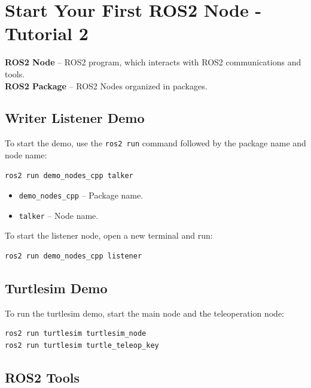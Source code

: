 \documentclass{article}
\newcommand{\code}[1]{\colorbox{codeBg}{\texttt{#1}}}
\begin{document}
\newpage

\section{Start Your First ROS2 Node - Tutorial 2}

\begin{notebox}
\textbf{ROS2 Node} -- ROS2 program, which interacts with ROS2 communications and tools. \\
\textbf{ROS2 Package} -- ROS2 Nodes organized in packages.
\end{notebox}

\subsection*{Writer Listener Demo}

To start the demo, use the \code{ros2 run} command followed by the package name and node name:
\begin{lstlisting}[style=bashStyle, language=bash]
ros2 run demo_nodes_cpp talker
\end{lstlisting}
\begin{itemize}
    \item \code{demo\_nodes\_cpp} -- Package name.
    \item \code{talker} -- Node name.
\end{itemize}

\vspace{0.3cm}
\noindent To start the listener node, open a new terminal and run:
\begin{lstlisting}[style=bashStyle, language=bash]
ros2 run demo_nodes_cpp listener
\end{lstlisting}

\subsection*{Turtlesim Demo}

To run the turtlesim demo, start the main node and the teleoperation node:
\begin{lstlisting}[style=bashStyle, language=bash]
ros2 run turtlesim turtlesim_node
ros2 run turtlesim turtle_teleop_key
\end{lstlisting}

\subsection*{ROS2 Tools}
\end{document}
